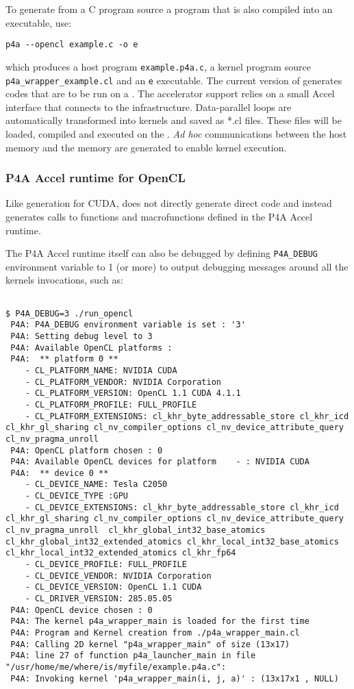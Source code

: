 \documentclass[a4paper]{article}
\begin{document}
To generate from a C program source a \Aopencl program that is also compiled
into an executable, use:
\begin{verbatim}
p4a --opencl example.c -o e
\end{verbatim}
which produces a host program \texttt{example.p4a.c}, a \Aopencl kernel program source 
\texttt{p4a\_wrapper\_example.cl} and an \texttt{e} executable. The current version of 
\Apfa generates \Aopencl codes that are to be run on a \Agpu. 
The \Agpu accelerator support relies on a small \Apfa Accel interface that connects to the
\Aopencl infrastructure. Data-parallel loops are automatically transformed
into \Aopencl kernels and saved as *.cl files. These files 
will be loaded, compiled and executed on the \Agpu. \emph{Ad
  hoc} communications between the host memory and the \Agpu memory are
generated to enable kernel execution. 

\subsubsection{P4A Accel runtime for OpenCL}
\label{sec:p4a-accel-runtime}

Like \Apfa generation for CUDA,  \Apfa does not directly generate
direct \Aopencl code and instead generates calls to functions and
macrofunctions defined in the P4A Accel runtime.

The P4A Accel runtime itself can also be debugged by defining \verb|P4A_DEBUG| 
environment variable to 1 (or more) to output debugging messages around all
the \Aopencl kernels invocations, such as: {\scriptsize
\begin{verbatim}

$ P4A_DEBUG=3 ./run_opencl
 P4A: P4A_DEBUG environment variable is set : '3'
 P4A: Setting debug level to 3
 P4A: Available OpenCL platforms :
 P4A:  ** platform 0 **
    - CL_PLATFORM_NAME: NVIDIA CUDA
    - CL_PLATFORM_VENDOR: NVIDIA Corporation
    - CL_PLATFORM_VERSION: OpenCL 1.1 CUDA 4.1.1
    - CL_PLATFORM_PROFILE: FULL_PROFILE
    - CL_PLATFORM_EXTENSIONS: cl_khr_byte_addressable_store cl_khr_icd cl_khr_gl_sharing cl_nv_compiler_options cl_nv_device_attribute_query cl_nv_pragma_unroll 
 P4A: OpenCL platform chosen : 0
 P4A: Available OpenCL devices for platform    - : NVIDIA CUDA
 P4A:  ** device 0 **
    - CL_DEVICE_NAME: Tesla C2050
    - CL_DEVICE_TYPE :GPU
    - CL_DEVICE_EXTENSIONS: cl_khr_byte_addressable_store cl_khr_icd cl_khr_gl_sharing cl_nv_compiler_options cl_nv_device_attribute_query cl_nv_pragma_unroll  cl_khr_global_int32_base_atomics cl_khr_global_int32_extended_atomics cl_khr_local_int32_base_atomics cl_khr_local_int32_extended_atomics cl_khr_fp64 
    - CL_DEVICE_PROFILE: FULL_PROFILE
    - CL_DEVICE_VENDOR: NVIDIA Corporation
    - CL_DEVICE_VERSION: OpenCL 1.1 CUDA
    - CL_DRIVER_VERSION: 285.05.05
 P4A: OpenCL device chosen : 0
 P4A: The kernel p4a_wrapper_main is loaded for the first time
 P4A: Program and Kernel creation from ./p4a_wrapper_main.cl
 P4A: Calling 2D kernel "p4a_wrapper_main" of size (13x17)
 P4A: line 27 of function p4a_launcher_main in file "/usr/home/me/where/is/myfile/example.p4a.c":
 P4A: Invoking kernel 'p4a_wrapper_main(i, j, a)' : (13x17x1 , NULL)
\end{verbatim}

}
\end{document}
